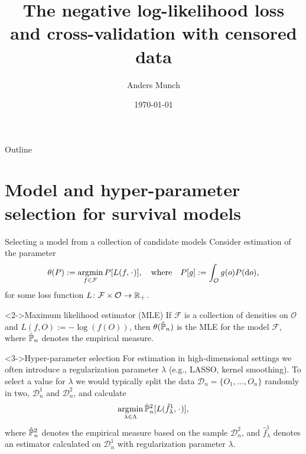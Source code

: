 \documentclass[smaller]{beamer}\usepackage{listings}
\institute{PhD Student, Section of Biostatistics \\ University of Copenhagen}
\author{Anders Munch}
\date{\today}
\title{The negative log-likelihood loss and cross-validation with censored data}
\begin{document}
\maketitle
\begin{frame}{Outline}
\tableofcontents
\end{frame}

\section{Model and hyper-parameter selection for survival models}
\label{sec:org750d397}
\begin{frame}[label={sec:org91a6fc6}]{Selecting a model from a collection of candidate models}
\small Consider estimation of the parameter
\begin{equation*}
  \theta(P) := \argmin_{f \in\mathcal{F}} P[L(f, \blank)],
  \quad \text{where} \quad
  P[g] := \int_{\mathcal{O}}g(o) P(\diff o),
\end{equation*}
for some loss function $L \colon \mathcal{F} \times \mathcal{O} \rightarrow \mathbb{R}_+$.

\begin{exampleblock}<2->{\normalsize Maximum likelihood estimator (MLE)}
If \(\mathcal{F}\) is a collection of densities on \(\mathcal{O}\) and \(L(f, O) := -\log(f(O))\), then
\(\theta(\hat{\mathbb{P}}_n)\) is the MLE for the model \(\mathcal{F}\), where \(\hat{\mathbb{P}}_n\) denotes the empirical
measure.
\end{exampleblock}

\begin{exampleblock}<3->{\normalsize Hyper-parameter selection}
For estimation in high-dimensional settings we often introduce a regularization parameter $\lambda$
(e.g., LASSO, kernel smoothing). To select a value for $\lambda$ we would typically split the data
$\mathcal{D}_n = \{O_1, \dots, O_n\}$ randomly in two, $\mathcal{D}_n^1$ and $\mathcal{D}_n^2$, and
calculate
\begin{equation*}
\argmin_{\lambda\in\Lambda} \empmeas^{2}[L(\hat{f}^{1}_{\lambda}, \blank)],
\end{equation*}
where $\hat{\mathbb{P}}_n^2$ denotes the empirical measure based on the sample $\mathcal{D}_n^2$, and
$\hat{f}^1_{\lambda}$ denotes an estimator calculated on $\mathcal{D}_n^1$ with regularization
parameter $\lambda$.
\end{exampleblock}
\end{frame}
\end{document}
